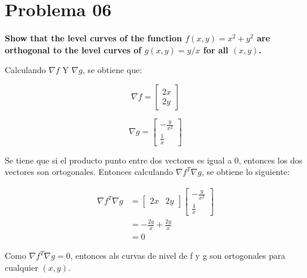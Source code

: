 \section*{Problema 06}

\textbf{Show that the level curves of the function $f(x,y)=x^2+y^2$ are orthogonal to the level curves of $g(x,y)=y/x$ for all $(x,y)$.}

Calculando $\nabla f$ Y $\nabla g$, se obtiene que:

\begin{minipage}{0.45\linewidth}
    \begin{equation*}
        \nabla f = \begin{bmatrix}
            2x \\ 2y
        \end{bmatrix}
    \end{equation*}
\end{minipage}
\begin{minipage}{0.45\linewidth}
    \begin{equation*}
        \nabla g = \begin{bmatrix}
            -\frac{y}{x^2} \\ \frac{1}{x}
        \end{bmatrix}
    \end{equation*}
\end{minipage}

Se tiene que si el producto punto entre dos vectores es igual a 0, entonces los dos vectores son ortogonales. Entonces calculando $\nabla f^T \nabla g$, se obtiene lo siguiente:

\begin{align*}
    \nabla f^T \nabla g & = \begin{bmatrix}
        2x & 2y
    \end{bmatrix} \begin{bmatrix}
        -\frac{y}{x^2} \\ \frac{1}{x}
    \end{bmatrix} \\
                        & = -\frac{2y}{x} + \frac{2y}{x}                        \\
                        & = 0
\end{align*}

Como $\nabla f^T \nabla g=0$, entonces als curvas de nivel de f y g son ortogonales para cualquier $(x,y)$.